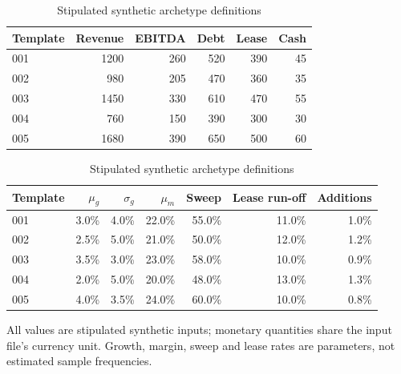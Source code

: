 \begin{table}[htbp]\centering\small
\caption{Stipulated synthetic archetype definitions}\label{tab:T1}
\begin{tabular}{lrrrrr}
\toprule
Template & Revenue & EBITDA & Debt & Lease & Cash \\
\midrule
001 & 1200 & 260 & 520 & 390 & 45 \\
002 & 980 & 205 & 470 & 360 & 35 \\
003 & 1450 & 330 & 610 & 470 & 55 \\
004 & 760 & 150 & 390 & 300 & 30 \\
005 & 1680 & 390 & 650 & 500 & 60 \\
\bottomrule
\end{tabular}
\medskip

\begin{tabular}{lrrrrrr}
\toprule
Template & $\mu_g$ & $\sigma_g$ & $\mu_m$ & Sweep & Lease run-off & Additions \\
\midrule
001 & 3.0\% & 4.0\% & 22.0\% & 55.0\% & 11.0\% & 1.0\% \\
002 & 2.5\% & 5.0\% & 21.0\% & 50.0\% & 12.0\% & 1.2\% \\
003 & 3.5\% & 3.0\% & 23.0\% & 58.0\% & 10.0\% & 0.9\% \\
004 & 2.0\% & 5.0\% & 20.0\% & 48.0\% & 13.0\% & 1.3\% \\
005 & 4.0\% & 3.5\% & 24.0\% & 60.0\% & 10.0\% & 0.8\% \\
\bottomrule
\end{tabular}
\par\smallskip
\begin{minipage}{\linewidth}\footnotesize All values are stipulated synthetic inputs; monetary quantities share the input file's currency unit. Growth, margin, sweep and lease rates are parameters, not estimated sample frequencies.\end{minipage}
\end{table}
